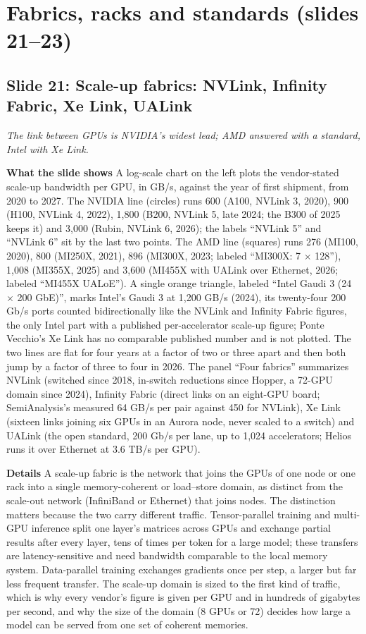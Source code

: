 \documentclass[11pt,letterpaper]{article}
\newcommand{\setstage}[1]{\colorlet{stagec}{#1}}
\newcommand{\slide}[3]{%
  \subsection[Slide #1: #2]{Slide #1: #2}%
  {\color{muted}\itshape #3\par}\medskip}
\newcommand{\para}[1]{\medskip\noindent\textbf{#1}\quad}
\begin{document}
\setstage{posc}
\section{Fabrics, racks and standards (slides 21--23)}

\slide{21}{Scale-up fabrics: NVLink, Infinity Fabric, Xe Link, UALink}{The link between GPUs is NVIDIA's widest lead; AMD answered with a standard, Intel with Xe Link.}

\para{What the slide shows} A log-scale chart on the left plots the vendor-stated scale-up bandwidth per GPU, in GB/s, against the year of first shipment, from 2020 to 2027. The NVIDIA line (circles) runs 600 (A100, NVLink 3, 2020), 900 (H100, NVLink 4, 2022), 1{,}800 (B200, NVLink 5, late 2024; the B300 of 2025 keeps it) and 3{,}000 (Rubin, NVLink 6, 2026); the labels ``NVLink 5'' and ``NVLink 6'' sit by the last two points. The AMD line (squares) runs 276 (MI100, 2020), 800 (MI250X, 2021), 896 (MI300X, 2023; labeled ``MI300X: 7 $\times$ 128''), 1{,}008 (MI355X, 2025) and 3{,}600 (MI455X with UALink over Ethernet, 2026; labeled ``MI455X UALoE''). A single orange triangle, labeled ``Intel Gaudi 3 (24 $\times$ 200 GbE)'', marks Intel's Gaudi 3 at 1{,}200 GB/s (2024), its twenty-four 200 Gb/s ports counted bidirectionally like the NVLink and Infinity Fabric figures, the only Intel part with a published per-accelerator scale-up figure; Ponte Vecchio's Xe Link has no comparable published number and is not plotted. The two lines are flat for four years at a factor of two or three apart and then both jump by a factor of three to four in 2026. The panel ``Four fabrics'' summarizes NVLink (switched since 2018, in-switch reductions since Hopper, a 72-GPU domain since 2024), Infinity Fabric (direct links on an eight-GPU board; SemiAnalysis's measured 64 GB/s per pair against 450 for NVLink), Xe Link (sixteen links joining six GPUs in an Aurora node, never scaled to a switch) and UALink (the open standard, 200 Gb/s per lane, up to 1{,}024 accelerators; Helios runs it over Ethernet at 3.6 TB/s per GPU).

\para{Details} A scale-up fabric is the network that joins the GPUs of one node or one rack into a single memory-coherent or load--store domain, as distinct from the scale-out network (InfiniBand or Ethernet) that joins nodes. The distinction matters because the two carry different traffic. Tensor-parallel training and multi-GPU inference split one layer's matrices across GPUs and exchange partial results after every layer, tens of times per token for a large model; these transfers are latency-sensitive and need bandwidth comparable to the local memory system. Data-parallel training exchanges gradients once per step, a larger but far less frequent transfer. The scale-up domain is sized to the first kind of traffic, which is why every vendor's figure is given per GPU and in hundreds of gigabytes per second, and why the size of the domain (8 GPUs or 72) decides how large a model can be served from one set of coherent memories.
\end{document}
